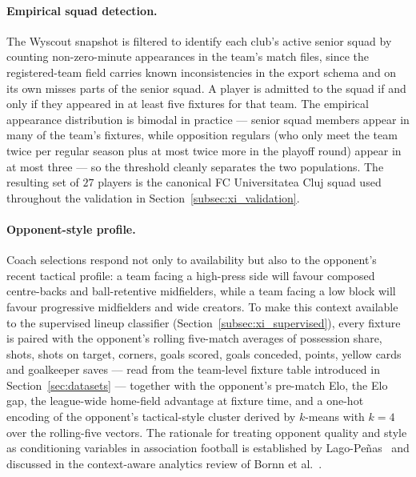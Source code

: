 \paragraph{Empirical squad detection.}
The Wyscout snapshot is filtered to identify each club's active senior squad by counting non-zero-minute appearances in the team's match files, since the registered-team field carries known inconsistencies in the export schema and on its own misses parts of the senior squad. A player is admitted to the squad if and only if they appeared in at least five fixtures for that team. The empirical appearance distribution is bimodal in practice --- senior squad members appear in many of the team's fixtures, while opposition regulars (who only meet the team twice per regular season plus at most twice more in the playoff round) appear in at most three --- so the threshold cleanly separates the two populations. The resulting set of $27$ players is the canonical FC Universitatea Cluj squad used throughout the validation in Section~\ref{subsec:xi_validation}.

\paragraph{Opponent-style profile.}
Coach selections respond not only to availability but also to the opponent's recent tactical profile: a team facing a high-press side will favour composed centre-backs and ball-retentive midfielders, while a team facing a low block will favour progressive midfielders and wide creators. To make this context available to the supervised lineup classifier (Section~\ref{subsec:xi_supervised}), every fixture is paired with the opponent's rolling five-match averages of possession share, shots, shots on target, corners, goals scored, goals conceded, points, yellow cards and goalkeeper saves --- read from the team-level fixture table introduced in Section~\ref{sec:datasets} --- together with the opponent's pre-match Elo, the Elo gap, the league-wide home-field advantage at fixture time, and a one-hot encoding of the opponent's tactical-style cluster derived by $k$-means with $k = 4$ over the rolling-five vectors. The rationale for treating opponent quality and style as conditioning variables in association football is established by Lago-Pe\~nas~\cite{lagopenas2010possession} and discussed in the context-aware analytics review of Bornn et al.~\cite{bornn2018soccer}.


